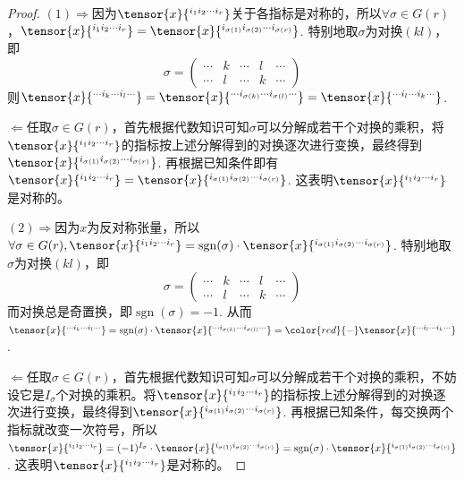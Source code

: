 \begin{proof}
	$(1)\Rightarrow$因为$\tensor{x}{^{i_{1}i_{2}\cdots i_{r}}}$关于各指标是对称的，所以$\forall \sigma\in G(r)$，$\tensor{x}{^{i_{1}i_{2}\cdots i_{r}}}=\tensor{x}{^{i_{\sigma(1)}i_{\sigma(2)}\cdots i_{\sigma(r)}}}$. 特别地取$\sigma$为对换$(kl)$，即
\[
	\sigma=\left(\begin{array}{lllll}
		\cdots & k &\cdots & l & \cdots  \\
	    \cdots & l &\cdots & k & \cdots 
		\end{array}\right)
\]
则$\tensor{x}{^{\cdots i_{k}\cdots i_{l}\cdots }}=\tensor{x}{^{\cdots i_{\sigma(k)}\cdots i_{\sigma(l)}\cdots }}=\tensor{x}{^{\cdots i_{l}\cdots i_{k}\cdots }}$.

$\Leftarrow$任取$\sigma\in G(r)$，首先根据代数知识可知$\sigma$可以分解成若干个对换的乘积，将$\tensor{x}{^{i_{1}i_{2}\cdots i_{r}}}$的指标按上述分解得到的对换逐次进行变换，最终得到$\tensor{x}{^{i_{\sigma(1)}i_{\sigma(2)}\cdots i_{\sigma(r)}}}$. 再根据已知条件即有$\tensor{x}{^{i_{1}i_{2}\cdots i_{r}}}=\tensor{x}{^{i_{\sigma(1)}i_{\sigma(2)}\cdots i_{\sigma(r)}}}$. 这表明$\tensor{x}{^{i_{1}i_{2}\cdots i_{r}}}$是对称的。

$(2)\Rightarrow$因为$x$为反对称张量，所以$\forall \sigma\in G(r),\tensor{x}{^{i_{1}i_{2}\cdots i_{r}}}=\operatorname{sgn}(\sigma)\cdot \tensor{x}{^{i_{\sigma(1)}i_{\sigma(2)}\cdots i_{\sigma(r)}}}$. 特别地取$\sigma$为对换$(kl)$，即
\[
	\sigma=\left(\begin{array}{lllll}
		\cdots & k &\cdots & l & \cdots  \\
	    \cdots & l &\cdots & k & \cdots 
		\end{array}\right)
\]
而对换总是奇置换，即$\operatorname{sgn}(\sigma)=-1$. 从而$\tensor{x}{^{\cdots i_{k}\cdots i_{l}\cdots }}=\operatorname{sgn}(\sigma)\cdot \tensor{x}{^{\cdots i_{\sigma(k)}\cdots i_{\sigma(l)}\cdots }}={\color{red}{-}}\tensor{x}{^{\cdots i_{l}\cdots i_{k}\cdots }}$.

$\Leftarrow$任取$\sigma\in G(r)$，首先根据代数知识可知$\sigma$可以分解成若干个对换的乘积，不妨设它是$I_{\sigma}$个对换的乘积。将$\tensor{x}{^{i_{1}i_{2}\cdots i_{r}}}$的指标按上述分解得到的对换逐次进行变换，最终得到$\tensor{x}{^{i_{\sigma(1)}i_{\sigma(2)}\cdots i_{\sigma(r)}}}$. 再根据已知条件，每交换两个指标就改变一次符号，所以$\tensor{x}{^{i_{1}i_{2}\cdots i_{r}}}=(-1)^{I_{\sigma}}\cdot \tensor{x}{^{i_{\sigma(1)}i_{\sigma(2)}\cdots i_{\sigma(r)}}}=\operatorname{sgn}(\sigma)\cdot \tensor{x}{^{i_{\sigma(1)}i_{\sigma(2)}\cdots i_{\sigma(r)}}}$. 这表明$\tensor{x}{^{i_{1}i_{2}\cdots i_{r}}}$是对称的。
\end{proof}

